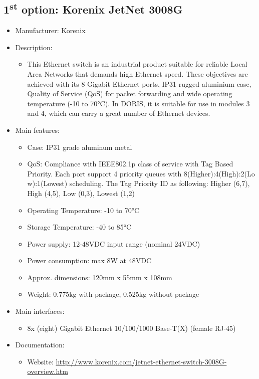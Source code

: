 \subsection{1\textsuperscript{st} option: Korenix JetNet 3008G} \label{DEVICE:ETHERNETSWITCH3008G}
\begin{itemize}
  \item Manufacturer: Korenix
  \item Description:
  \begin{itemize}
    \item This Ethernet switch is an industrial product suitable for reliable Local Area Networks that demands high Ethernet speed. These objectives are achieved with its 8 Gigabit Ethernet ports, IP31 rugged aluminium case, Quality of Service (QoS) for packet forwarding and wide operating temperature (-10 to 70°C). In DORIS, it is suitable for use in modules 3 and 4, which can carry a great number of Ethernet devices.
  \end{itemize}
  \item Main features:
  \begin{itemize}
    \item Case: IP31 grade aluminum metal
    \item QoS: Compliance with IEEE802.1p class of service with Tag Based Priority. Each port support 4 priority queues with 8(Higher):4(High):2(Lo w):1(Lowest) scheduling. The Tag Priority ID as following: Higher (6,7), High (4,5), Low (0,3), Lowest (1,2)
    \item Operating Temperature: -10 to 70°C
    \item Storage Temperature: -40 to 85°C
    \item Power supply: 12-48VDC input range (nominal 24VDC)
    \item Power consumption: max 8W at 48VDC
    \item Approx. dimensions: 120mm x 55mm x 108mm
    \item Weight: 0.775kg with package, 0.525kg without package
  \end{itemize}
  \item Main interfaces:
  \begin{itemize}
    \item 8x (eight) Gigabit Ethernet 10/100/1000 Base-T(X) (female RJ-45)
  \end{itemize}
  \item Documentation:
  \begin{itemize}
    \item Website: \href{http://www.korenix.com/jetnet-ethernet-switch-3008G-overview.htm}{http://www.korenix.com/jetnet-ethernet-switch-3008G-overview.htm}

\end{itemize}
\end{itemize}
